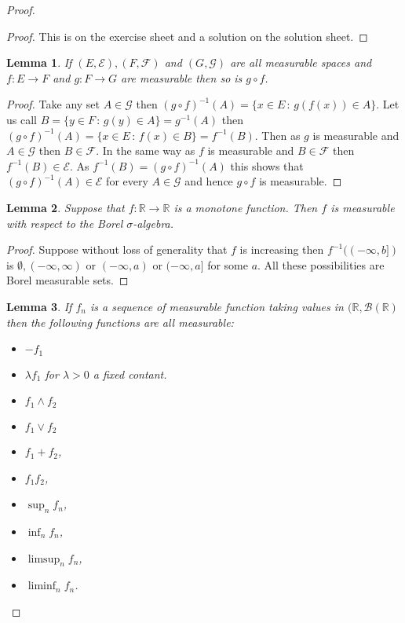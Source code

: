 \documentclass[
]{book}
\providecommand{\tightlist}{%
  \setlength{\itemsep}{0pt}\setlength{\parskip}{0pt}}
\newtheorem{lemma}{Lemma}[chapter]
\theoremstyle{definition}
\theoremstyle{definition}
\theoremstyle{definition}
\theoremstyle{definition}
\theoremstyle{remark}
\begin{document}
\begin{proof}
\begin{proof}
This is on the exercise sheet and a solution on the solution sheet.
\end{proof}

\begin{lemma}
If \((E, \mathcal{E}), (F, \mathcal{F})\) and \((G, \mathcal{G})\) are all measurable spaces and \(f : E \rightarrow F\) and \(g: F \rightarrow G\) are measurable then so is \(g \circ f\).
\end{lemma}

\begin{proof}
Take any set \(A \in \mathcal{G}\) then \((g\circ f)^{-1}(A) = \{ x \in E \,:\, g(f(x)) \in A\}\). Let us call \(B = \{y \in F \,:\, g(y) \in A\} = g^{-1}(A)\) then \((g \circ f)^{-1}(A) = \{ x \in E \,:\, f(x) \in B\} = f^{-1}(B)\). Then as \(g\) is measurable and \(A \in \mathcal{G}\) then \(B \in \mathcal{F}\). In the same way as \(f\) is measurable and \(B \in \mathcal{F}\) then \(f^{-1}(B) \in \mathcal{E}\). As \(f^{-1}(B) = (g \circ f)^{-1}(A)\) this shows that \((g \circ f)^{-1}(A) \in \mathcal{E}\) for every \(A \in \mathcal{G}\) and hence \(g \circ f\) is measurable.
\end{proof}

\begin{lemma}
Suppose that \(f: \mathbb{R} \rightarrow \mathbb{R}\) is a monotone function. Then \(f\) is measurable with respect to the Borel \(\sigma\)-algebra.
\end{lemma}

\begin{proof}
Suppose without loss of generality that \(f\) is increasing then \(f^{-1}((-\infty, b])\) is \(\emptyset, (-\infty, \infty)\) or \((-\infty, a)\) or \((-\infty, a]\) for some \(a\). All these possibilities are Borel measurable sets.
\end{proof}

\begin{lemma}

If \(f_n\) is a sequence of measurable function taking values in \((\mathbb{R}, \mathcal{B}(\mathbb{R})\) then the following functions are all measurable:

\begin{itemize}
\tightlist
\item
  \(-f_1\)
\item
  \(\lambda f_1\) for \(\lambda >0\) a fixed contant.
\item
  \(f_1 \wedge f_2\)
\item
  \(f_1 \vee f_2\)
\item
  \(f_1+f_2\),
\item
  \(f_1 f_2\),
\item
  \(\sup_n f_n\),
\item
  \(\inf_n f_n\),
\item
  \(\limsup_n f_n\),
\item
  \(\liminf_n f_n\).
\end{itemize}


\end{lemma}
\end{proof}
\end{document}
